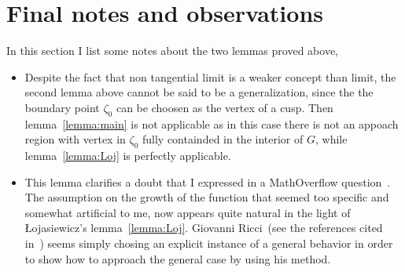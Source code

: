 \documentclass[a4paper,10pt]{article}
\begin{document}
\section{Final notes and observations}
In this section I list some notes about the two lemmas proved above,
\begin{itemize}
\item Despite the fact that non tangential limit is a weaker concept than limit, the second lemma above cannot be said to be a generalization, since the the boundary point $\zeta_0$ can be choosen as the vertex of a cusp. Then lemma~\ref{lemma:main} is not applicable as in this case there is not an appoach region with vertex in $\zeta_0$ fully containded in the interior of $G$, while lemma~\ref{lemma:Loj} is perfectly applicable.
\item This lemma clarifies a doubt that I expressed in a MathOverflow question~\cite{396814}. The assumption on the growth of the function that seemed too specific and somewhat artificial to me, now appears quite natural in the light of Łojasiewicz's lemma~\ref{lemma:Loj}. Giovanni Ricci~(see the references cited in~\cite{396814}) seems simply chosing an explicit instance of a general behavior in order to show how to approach the general case by using his method.
\end{itemize}



\end{document}
